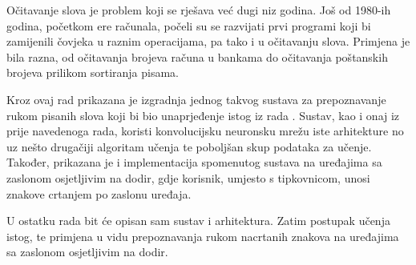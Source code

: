 Očitavanje slova je problem koji se rješava već dugi niz godina. Još od 1980-ih godina, početkom ere računala, počeli su se razvijati prvi programi koji bi zamijenili čovjeka u raznim operacijama, pa tako i u očitavanju slova. Primjena je bila razna, od očitavanja brojeva računa u bankama do očitavanja poštanskih brojeva prilikom sortiranja pisama.

Kroz ovaj rad prikazana je izgradnja jednog takvog sustava za prepoznavanje rukom pisanih slova koji bi bio unaprjeđenje istog iz rada \cite{seminar}. Sustav, kao i onaj iz prije navedenoga rada, koristi konvolucijsku neuronsku mrežu iste arhitekture no uz nešto drugačiji algoritam učenja te poboljšan skup podataka za učenje. Također, prikazana je i implementacija spomenutog sustava na uređajima sa zaslonom osjetljivim na dodir, gdje korisnik, umjesto s tipkovnicom, unosi znakove crtanjem po zaslonu uređaja.

U ostatku rada bit će opisan sam sustav i arhitektura. Zatim postupak učenja istog, te primjena u vidu prepoznavanja rukom nacrtanih znakova na uređajima sa zaslonom osjetljivim na dodir.